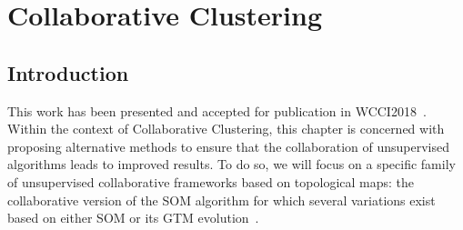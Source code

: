 \chapter{Collaborative Clustering}


\section{Introduction}

This work has been presented and accepted for publication in WCCI2018~\cite{sublime2018optimizing}.\\



Within the context of Collaborative Clustering, this chapter is concerned with proposing alternative methods to ensure that the collaboration of unsupervised algorithms leads to improved results. To do so, we will focus on a specific family of unsupervised collaborative frameworks based on topological maps: the collaborative version of the SOM algorithm for which several variations exist based on either SOM or its GTM evolution~\cite{grozavu2010topological,journals/ijcia/GhassanyGB12,Sublime16HIS}. 


